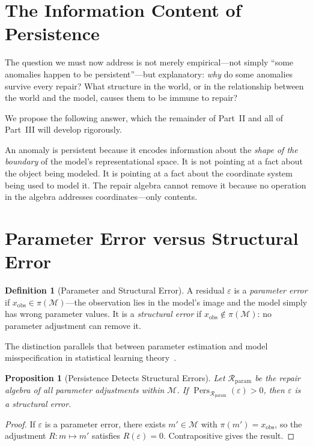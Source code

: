 \documentclass[12pt,oneside]{book}
\theoremstyle{plain}
\newtheorem{proposition}[theorem]{Proposition}
\theoremstyle{definition}
\newtheorem{definition}[theorem]{Definition}
\theoremstyle{remark}
\DeclareMathOperator{\Pers}{Pers}
\newcommand{\R}{\mathcal{R}}
\newcommand{\M}{\mathcal{M}}
\newcommand{\eps}{\varepsilon}
\newcommand{\1}{\mathbf{1}}
\begin{document}
\section{The Information Content of Persistence}

The question we must now address is not merely empirical---not simply ``some anomalies happen to be persistent''---but explanatory: \emph{why} do some anomalies survive every repair? What structure in the world, or in the relationship between the world and the model, causes them to be immune to repair?

We propose the following answer, which the remainder of Part~II and all of Part~III will develop rigorously.

An anomaly is persistent because it encodes information about the \emph{shape of the boundary} of the model's representational space. It is not pointing at a fact about the object being modeled. It is pointing at a fact about the coordinate system being used to model it. The repair algebra cannot remove it because no operation in the algebra addresses coordinates---only contents.

\section{Parameter Error versus Structural Error}

\begin{definition}[Parameter and Structural Error]
A residual $\eps$ is a \emph{parameter error} if $x_{\mathrm{obs}} \in \pi(\M)$---the observation lies in the model's image and the model simply has wrong parameter values. It is a \emph{structural error} if $x_{\mathrm{obs}} \notin \pi(\M)$: no parameter adjustment can remove it.
\end{definition}

The distinction parallels that between parameter estimation and model misspecification in statistical learning theory~\cite{vapnik1998,mackay2003}.

\begin{proposition}[Persistence Detects Structural Errors]
\label{prop:structural}
Let $\R_{\mathrm{param}}$ be the repair algebra of all parameter adjustments within $\M$. If $\Pers_{\R_{\mathrm{param}}}(\eps) > 0$, then $\eps$ is a structural error.
\end{proposition}

\begin{proof}
If $\eps$ is a parameter error, there exists $m' \in \M$ with $\pi(m') = x_{\mathrm{obs}}$, so the adjustment $R: m \mapsto m'$ satisfies $R(\eps) = 0$. Contrapositive gives the result.
\end{proof}
\end{document}
